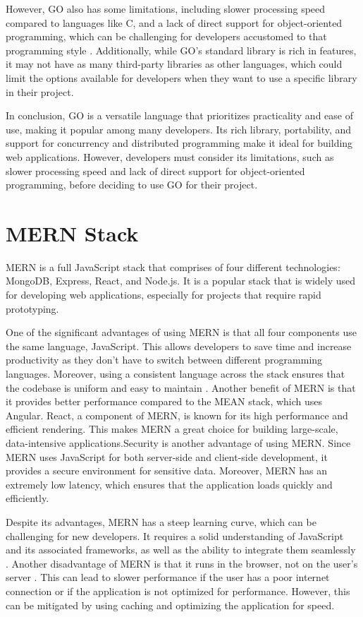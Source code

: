 However, GO also has some limitations, including slower processing speed compared to languages like C, and a lack of direct support for object-oriented programming, which can be challenging for developers accustomed to that programming style \cite{mihalis}. Additionally, while GO's standard library is rich in features, it may not have as many third-party libraries as other languages, which could limit the options available for developers when they want to use a specific library in their project. 

In conclusion, GO is a versatile language that prioritizes practicality and ease of use, making it popular among many developers. Its rich library, portability, and support for concurrency and distributed programming make it ideal for building web applications. However, developers must consider its limitations, such as slower processing speed and lack of direct support for object-oriented programming, before deciding to use GO for their project.

\section{MERN Stack}
MERN is a full JavaScript stack that comprises of four different technologies: MongoDB, Express, React, and Node.js. It is a popular stack that is widely used for developing web applications, especially for projects that require rapid prototyping.

One of the significant advantages of using MERN is that all four components use the same language, JavaScript. This allows developers to save time and increase productivity as they don't have to switch between different programming languages. Moreover, using a consistent language across the stack ensures that the codebase is uniform and easy to maintain \cite{shama}. Another benefit of MERN is that it provides better performance compared to the MEAN stack, which uses Angular. React, a component of MERN, is known for its high performance and efficient rendering. This makes MERN a great choice for building large-scale, data-intensive applications.Security is another advantage of using MERN. Since MERN uses JavaScript for both server-side and client-side development, it provides a secure environment for sensitive data. Moreover, MERN has an extremely low latency, which ensures that the application loads quickly and efficiently.

Despite its advantages, MERN has a steep learning curve, which can be challenging for new developers. It requires a solid understanding of JavaScript and its associated frameworks, as well as the ability to integrate them seamlessly \cite{eddy}. Another disadvantage of MERN is that it runs in the browser, not on the user's server \cite{asvj}. This can lead to slower performance if the user has a poor internet connection or if the application is not optimized for performance. However, this can be mitigated by using caching and optimizing the application for speed.

